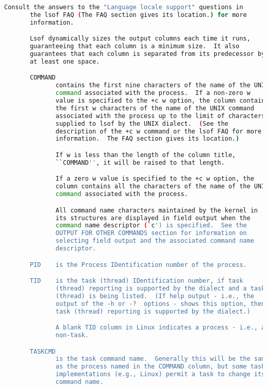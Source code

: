 {{\begin{lstlisting}[language=bash]
       Consult the answers to the "Language locale support" questions in
       the lsof FAQ (The FAQ section gives its location.) for more
       information.

       Lsof dynamically sizes the output columns each time it runs,
       guaranteeing that each column is a minimum size.  It also
       guarantees that each column is separated from its predecessor by
       at least one space.

       COMMAND
              contains the first nine characters of the name of the UNIX
              command associated with the process.  If a non-zero w
              value is specified to the +c w option, the column contains
              the first w characters of the name of the UNIX command
              associated with the process up to the limit of characters
              supplied to lsof by the UNIX dialect.  (See the
              description of the +c w command or the lsof FAQ for more
              information.  The FAQ section gives its location.)

              If w is less than the length of the column title,
              ``COMMAND'', it will be raised to that length.

              If a zero w value is specified to the +c w option, the
              column contains all the characters of the name of the UNIX
              command associated with the process.

              All command name characters maintained by the kernel in
              its structures are displayed in field output when the
              command name descriptor (`c') is specified.  See the
              OUTPUT FOR OTHER COMMANDS section for information on
              selecting field output and the associated command name
              descriptor.

       PID    is the Process IDentification number of the process.

       TID    is the task (thread) IDentification number, if task
              (thread) reporting is supported by the dialect and a task
              (thread) is being listed.  (If help output - i.e., the
              output of the -h or -?  options - shows this option, then
              task (thread) reporting is supported by the dialect.)

              A blank TID column in Linux indicates a process - i.e., a
              non-task.

       TASKCMD
              is the task command name.  Generally this will be the same
              as the process named in the COMMAND column, but some task
              implementations (e.g., Linux) permit a task to change its
              command name.


\end{lstlisting}}}

